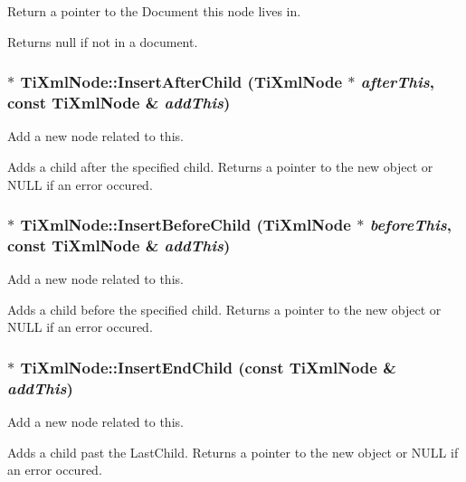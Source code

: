 Return a pointer to the Document this node lives in. 

Returns null if not in a document.
\subsubsection{ $\ast$ Ti\-Xml\-Node::Insert\-After\-Child ({\bf Ti\-Xml\-Node} $\ast$ {\em after\-This}, const {\bf Ti\-Xml\-Node} \& {\em add\-This})\hspace{0.3cm}{\tt  [inherited]}}\label{classTiXmlNode_TiXmlUnknowna35}


Add a new node related to this. 

Adds a child after the specified child. Returns a pointer to the new object or NULL if an error occured.
\subsubsection{ $\ast$ Ti\-Xml\-Node::Insert\-Before\-Child ({\bf Ti\-Xml\-Node} $\ast$ {\em before\-This}, const {\bf Ti\-Xml\-Node} \& {\em add\-This})\hspace{0.3cm}{\tt  [inherited]}}\label{classTiXmlNode_TiXmlUnknowna34}


Add a new node related to this. 

Adds a child before the specified child. Returns a pointer to the new object or NULL if an error occured.
\subsubsection{ $\ast$ Ti\-Xml\-Node::Insert\-End\-Child (const {\bf Ti\-Xml\-Node} \& {\em add\-This})\hspace{0.3cm}{\tt  [inherited]}}\label{classTiXmlNode_TiXmlUnknowna32}


Add a new node related to this. 

Adds a child past the Last\-Child. Returns a pointer to the new object or NULL if an error occured.
